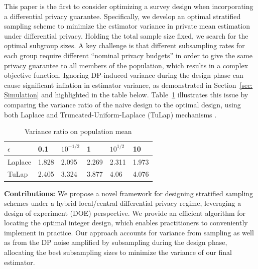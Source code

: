 \documentclass{article}
\theoremstyle{definition}
\begin{document}
This paper is the first to consider optimizing a survey design when incorporating a differential privacy guarantee. Specifically, we develop an optimal stratified sampling scheme to minimize the estimator variance in private mean estimation under differential privacy. Holding the total sample size fixed, we search for the optimal subgroup sizes. A key challenge is that different subsampling rates for each group require different ``nominal privacy budgets'' in order to give the same privacy guarantee to all members of the population, which results in a complex objective function.  Ignoring DP-induced variance during the design phase can cause significant inflation in estimator variance, as demonstrated in Section~\ref{sec: Simulation} and highlighted in the table below. Table~\ref{tab: variance ratio demo} illustrates this issue by comparing the variance ratio of the naive design to the optimal design, using both Laplace and Truncated-Uniform-Laplace (TuLap) mechanisms \citep{Awan_Slavković_2018}.

\begin{table}[H]
    \begin{center}
       \begin{tabular}{llllll}%
          \toprule
          {$\epsilon$} & {0.1} & {$10^{-1/2}$} & {1} & {$10^{1/2}$} & {10} \\ 
          \midrule
          Laplace & 1.828 & 2.095 & 2.269 & 2.311 & 1.973 \\ 
          TuLap & 2.405 & 3.324 & 3.877 & 4.06 & 4.076 \\ 
          \bottomrule
       \end{tabular}
    \end{center}
   \caption{Variance ratio on population mean}
   \label{tab: variance ratio demo}
\end{table}

\textbf{Contributions:} We propose a novel framework for designing stratified sampling schemes under a hybrid local/central differential privacy regime, leveraging a design of experiment (DOE) perspective. We provide an efficient algorithm for locating the optimal integer design, which enables practitioners to conveniently implement in practice. Our approach accounts for variance from sampling as well as from the DP noise amplified by subsampling during the design phase, allocating the best subsampling sizes to minimize the variance of our final estimator.
\end{document}
